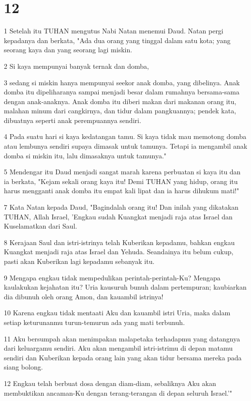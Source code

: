 \chapter{12}

\par 1 Setelah itu TUHAN mengutus Nabi Natan menemui Daud. Natan pergi kepadanya dan berkata, "Ada dua orang yang tinggal dalam satu kota; yang seorang kaya dan yang seorang lagi miskin.
\par 2 Si kaya mempunyai banyak ternak dan domba,
\par 3 sedang si miskin hanya mempunyai seekor anak domba, yang dibelinya. Anak domba itu dipeliharanya sampai menjadi besar dalam rumahnya bersama-sama dengan anak-anaknya. Anak domba itu diberi makan dari makanan orang itu, malahan minum dari cangkirnya, dan tidur dalam pangkuannya; pendek kata, dibuatnya seperti anak perempuannya sendiri.
\par 4 Pada suatu hari si kaya kedatangan tamu. Si kaya tidak mau memotong domba atau lembunya sendiri supaya dimasak untuk tamunya. Tetapi ia mengambil anak domba si miskin itu, lalu dimasaknya untuk tamunya."
\par 5 Mendengar itu Daud menjadi sangat marah karena perbuatan si kaya itu dan ia berkata, "Kejam sekali orang kaya itu! Demi TUHAN yang hidup, orang itu harus mengganti anak domba itu empat kali lipat dan ia harus dihukum mati!"
\par 7 Kata Natan kepada Daud, "Bagindalah orang itu! Dan inilah yang dikatakan TUHAN, Allah Israel, 'Engkau sudah Kuangkat menjadi raja atas Israel dan Kuselamatkan dari Saul.
\par 8 Kerajaan Saul dan istri-istrinya telah Kuberikan kepadamu, bahkan engkau Kuangkat menjadi raja atas Israel dan Yehuda. Seandainya itu belum cukup, pasti akan Kuberikan lagi kepadamu sebanyak itu.
\par 9 Mengapa engkau tidak mempedulikan perintah-perintah-Ku? Mengapa kaulakukan kejahatan itu? Uria kausuruh bunuh dalam pertempuran; kaubiarkan dia dibunuh oleh orang Amon, dan kauambil istrinya!
\par 10 Karena engkau tidak mentaati Aku dan kauambil istri Uria, maka dalam setiap keturunanmu turun-temurun ada yang mati terbunuh.
\par 11 Aku bersumpah akan menimpakan malapetaka terhadapmu yang datangnya dari keluargamu sendiri. Aku akan mengambil istri-istrimu di depan matamu sendiri dan Kuberikan kepada orang lain yang akan tidur bersama mereka pada siang bolong.
\par 12 Engkau telah berbuat dosa dengan diam-diam, sebaliknya Aku akan membuktikan ancaman-Ku dengan terang-terangan di depan seluruh Israel.'"
